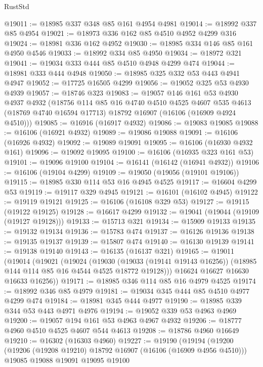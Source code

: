 \begin{lexlean}{RustStd}
\begin{coremodule}
@19011 := @18985 @337 @348 @85 @161 @4954 @4981
@19014 := @18992 @337 @85 @4954
@19021 := @18973 @336 @162 @85 @4510 @4952 @4299 @316
@19024 := @18981 @336 @162 @4952
@19030 := @18985 @334 @146 @85 @161 @4950 @4546
@19033 := @18992 @334 @85 @4950
@19034 := @18972 @321
@19041 := @19034 @333 @444 @85 @4510 @4948 @4299 @474
@19044 := @18981 @333 @444 @4948
@19050 := @18985 @325 @332 @53 @443 @4941 @4947
@19052 := @17725 @16505 @4299
@19056 := @19052 @325 @53 @4930 @4939
@19057 := @18746 @323
@19083 := @19057
    @146
    @161
    @53
    @4930
    @4937
    @4932
    (@18756
      @114
      @85
      @16
      @4740
      @4510
      @4525
      @4607
      @535
      @4613
      (@18769 @4740 @16594 @17713)
      @18792
      @16907
      (@16106 (@16909 @4924 @4510)))
@19085 := @16916 (@16917 @4932)
@19086 := @19083 @19085
@19088 := @16106 (@16921 @4932)
@19089 := @19086 @19088
@19091 := @16106 (@16926 @4932)
@19092 := @19089 @19091
@19095 := @16106 (@16930 @4932 @161)
@19096 := @19092 @19095
@19100 := @16106 (@16935 @323 @161 @53)
@19101 := @19096 @19100
@19104 := @16141 (@16142 (@16941 @4932))
@19106 := @16106 (@19104 @4299)
@19109 := @19050 (@19056 (@19101 @19106))
@19115 := @18985 @330 @114 @53 @16 @4945 @4525
@19117 := @16604 @4299 @53
@19119 := @19117 @329 @4945
@19121 := @16101 (@16102 @4945)
@19122 := @19119 @19121
@19125 := @16106 (@16108 @329 @53)
@19127 := @19115 (@19122 @19125)
@19128 := @16617 @4299
@19132 := @19041 (@19044 (@19109 (@19127 @19128)))
@19133 := @15713 @321
@19134 := @15909 @19133
@19135 := @19132 @19134
@19136 := @15783 @474
@19137 := @16126 @19136
@19138 := @19135 @19137
@19139 := @15807 @474
@19140 := @16130 @19139
@19141 := @19138 @19140
@19143 := @16135 (@16137 @321)
@19165 := @19011
    (@19014
      (@19021
        (@19024
          (@19030
            (@19033 (@19141 @19143 @16256))
            (@18985 @144 @114 @85 @16 @4544 @4525 @18772 @19128)))
        @16624
        @16627
        @16630
        @16633
        @16256))
@19171 := @18985 @346 @114 @85 @16 @4979 @4525
@19174 := @18992 @346 @85 @4979
@19181 := @19034 @345 @444 @85 @4510 @4977 @4299 @474
@19184 := @18981 @345 @444 @4977
@19190 := @18985 @339 @344 @53 @443 @4971 @4976
@19194 := @19052 @339 @53 @4963 @4969
@19200 := @19057 @194 @161 @53 @4963 @4967 @4932
@19206 := @18777 @4960 @4510 @4525 @4607 @544 @4613
@19208 := @18786 @4960 @16649
@19210 := @16302 (@16303 @4960)
@19227 := @19190
    (@19194
      (@19200
        (@19206 (@19208 @19210) @18792 @16907 (@16106 (@16909 @4956 @4510)))
        @19085
        @19088
        @19091
        @19095
        @19100

\end{coremodule}
\end{lexlean}
